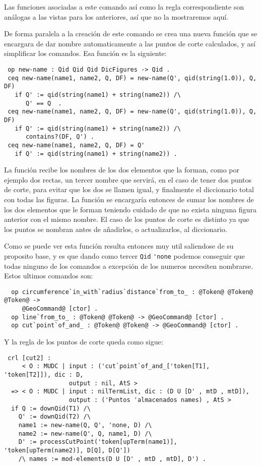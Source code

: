 Las funciones asociadas a este comando así como la regla correspondiente son análogas a las vistas para los anteriores, así que no la mostraremos aquí. \par

De forma paralela a la creación de este comando se crea una nueva función que se encargara de dar nombre automaticamente a las puntos de corte calculados, y así simplificar los comandos. Esa función es la siguiente:

{\codesize
\begin{verbatim}
 op new-name : Qid Qid Qid DicFigures -> Qid .
 ceq new-name(name1, name2, Q, DF) = new-name(Q', qid(string(1.0)), Q, DF)
   if Q' := qid(string(name1) + string(name2)) /\
      Q' == Q  . 
 ceq new-name(name1, name2, Q, DF) = new-name(Q', qid(string(1.0)), Q, DF)
   if Q' := qid(string(name1) + string(name2)) /\
      contains?(DF, Q') .
 ceq new-name(name1, name2, Q, DF) = Q'
   if Q' := qid(string(name1) + string(name2)) .
\end{verbatim}
}

La función recibe los nombres de los dos elementos que la forman, como por ejemplo dos rectas, un tercer nombre que servirá, en el caso de tener dos puntos de corte, para evitar que los dos se llamen igual, y finalmente el diccionario total con todas las figuras. La función se encargaría entonces de sumar los nombres de los dos elementos que le forman teniendo cuidado de que no exista ninguna figura anterior con el mismo nombre. El caso de los puntos de corte es distinto ya que los puntos se nombran antes de añadirlos, o actualizarlos, al diccionario.\par

Como se puede ver esta función resulta entonces muy util saliendose de su proposito base, y es que dando como tercer \verb"Qid" \verb"'none" podemos conseguir que todas ninguno de los comandos a excepción de los numeros necesiten nombrarse. Estos ultimos comandos son:

{\codesize
\begin{verbatim}
  op circumference`in_with`radius`distance`from_to_ : @Token@ @Token@ @Token@ ->  
     @GeoCommand@ [ctor] .
  op line`from_to_ : @Token@ @Token@ -> @GeoCommand@ [ctor] .
  op cut`point`of_and_ : @Token@ @Token@ -> @GeoCommand@ [ctor] .
\end{verbatim}
}

Y la regla de los puntos de corte queda como sigue:

{\codesize
\begin{verbatim}
 crl [cut2] :
     < O : MUDC | input : ('cut`point`of_and_['token[T1], 'token[T2]]), dic : D,
                  output : nil, AtS >
  => < O : MUDC | input : nilTermList, dic : (D U [D' , mtD , mtD]),
                  output : ('Puntos 'almacenados names) , AtS >
  if Q := downQid(T1) /\
    Q' := downQid(T2) /\
    name1 := new-name(Q, Q', 'none, D) /\
    name2 := new-name(Q', Q, name1, D) /\
    D' := processCutPoint('token[upTerm(name1)], 'token[upTerm(name2)], D[Q], D[Q']) 
    /\ names := mod-elements(D U [D' , mtD , mtD], D') .
\end{verbatim}
}

